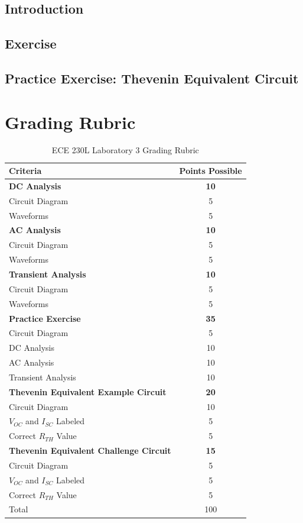 \documentclass[12pt]{../manual}
\begin{document}
\subsection{Introduction}
\subsection{Exercise}
\subsection{Practice Exercise: Thevenin Equivalent Circuit}

\newpage
{} %
\section*{Grading Rubric}
\vfill %
\begin{table}[ht!]
\caption{ECE 230L Laboratory 3 Grading Rubric}
\centering
\begin{tabular}{l|c} \hline
Criteria & Points Possible \\ \hline \hline
\textbf{DC Analysis}			& \textbf{10} \\
Circuit Diagram 				& 5 \\
Waveforms 						& 5 \\ \hline
\textbf{AC Analysis}			& \textbf{10} \\
Circuit Diagram 				& 5 \\
Waveforms 						& 5 \\ \hline
\textbf{Transient Analysis}		& \textbf{10} \\
Circuit Diagram 				& 5 \\ 
Waveforms 						& 5 \\ \hline
\textbf{Practice Exercise}		& \textbf{35} \\
Circuit Diagram 				& 5 \\
DC Analysis						& 10 \\
AC Analysis						& 10 \\
Transient Analysis				& 10 \\ \hline
\textbf{Thevenin Equivalent Example Circuit} & \textbf{20} \\
Circuit Diagram					& 10 \\
$V_{OC}$ and $I_{SC}$ Labeled	& 5 \\
Correct $R_{TH}$ Value			& 5 \\ \hline
\textbf{Thevenin Equivalent Challenge Circuit} & \textbf{15} \\
Circuit Diagram					& 5 \\
$V_{OC}$ and $I_{SC}$ Labeled	& 5 \\
Correct $R_{TH}$ Value			& 5 \\ \hline \hline
Total							& 100 \\ \hline
\end{tabular}
\end{table}
\vfill %
\end{document}

